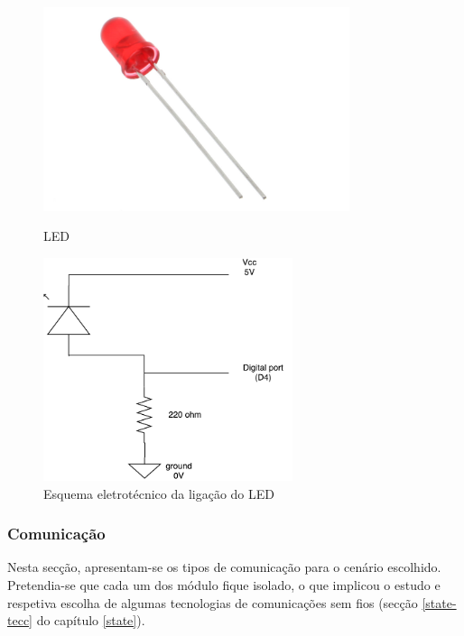 \begin{figure}[h]
	\centering
	\begin{minipage}[b]{0.49\textwidth}
		\centering
		\includegraphics[width=0.8\textwidth]{img/hardware/led.jpg}
		\caption{\ac{LED}}
	\end{minipage}
	\hfill
	\begin{minipage}[b]{0.49\textwidth}
		\centering
		\includegraphics[width=0.65\textwidth]{img/hardware/led_esquema.pdf}
		\caption{Esquema eletrotécnico da ligação do \ac{LED}}
		\label{ligacao}
	\end{minipage}
\end{figure}



\subsubsection{Comunicação}

Nesta secção, apresentam-se os tipos de comunicação para o cenário escolhido. Pretendia-se que cada um dos módulo fique isolado, o que implicou o estudo e respetiva escolha de algumas tecnologias de comunicações sem fios (secção \ref{state-tecc} do capítulo \ref{state}). 

